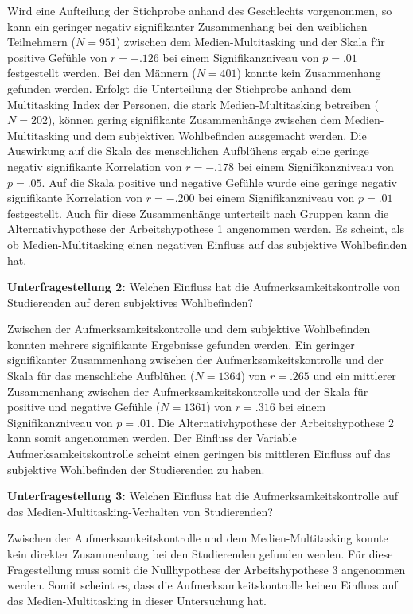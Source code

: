 Wird eine Aufteilung der Stichprobe anhand des Geschlechts vorgenommen, so kann ein geringer negativ signifikanter Zusammenhang bei den weiblichen Teilnehmern ($N=951$) zwischen dem Medien-Multitasking und der Skala für positive Gefühle von $r=-.126$ bei einem Signifikanzniveau von $p=.01$ festgestellt werden. Bei den Männern ($N=401$) konnte kein Zusammenhang gefunden werden. Erfolgt die Unterteilung der Stichprobe anhand dem Multitasking Index der Personen, die stark Medien-Multitasking betreiben ($N=202$), können gering signifikante Zusammenhänge zwischen dem Medien-Multitasking und dem subjektiven Wohlbefinden ausgemacht werden. Die Auswirkung auf die Skala des  menschlichen Aufblühens ergab eine geringe negativ signifikante Korrelation von $r=-.178$ bei einem Signifikanzniveau von $p=.05$. Auf die Skala positive und negative Gefühle wurde eine geringe negativ signifikante Korrelation von $r=-.200$ bei einem Signifikanzniveau von $p=.01$ festgestellt. Auch für diese Zusammenhänge unterteilt nach Gruppen kann die Alternativhypothese der Arbeitshypothese 1 angenommen werden. Es scheint, als ob Medien-Multitasking einen negativen Einfluss auf das subjektive Wohlbefinden hat.
\par
\textbf{Unterfragestellung 2:} Welchen Einfluss hat die Aufmerksamkeitskontrolle von Studierenden auf deren subjektives Wohlbefinden?
\par
Zwischen der Aufmerksamkeitskontrolle und dem subjektive Wohlbefinden konnten mehrere signifikante Ergebnisse gefunden werden. Ein geringer signifikanter Zusammenhang zwischen der Aufmerksamkeitskontrolle und der Skala für das menschliche Aufblühen ($N=1364$) von $r=.265$ und ein mittlerer Zusammenhang zwischen der Aufmerksamkeitskontrolle und der Skala für positive und negative Gefühle ($N=1361$) von $r=.316$ bei einem Signifikanzniveau von $p=.01$. Die Alternativhypothese der Arbeitshypothese 2 kann somit angenommen werden. Der Einfluss der Variable Aufmerksamkeitskontrolle scheint einen geringen bis mittleren Einfluss auf das subjektive Wohlbefinden der Studierenden zu haben.
\par
\textbf{Unterfragestellung 3:} Welchen Einfluss hat die Aufmerksamkeitskontrolle auf das Medien-Multitasking-Verhalten von Studierenden?
\par
Zwischen der Aufmerksamkeitskontrolle und dem Medien-Multitasking konnte kein direkter Zusammenhang bei den Studierenden gefunden werden. Für diese Fragestellung muss somit die Nullhypothese der Arbeitshypothese 3 angenommen werden. Somit scheint es, dass die Aufmerksamkeitskontrolle keinen Einfluss auf das Medien-Multitasking in dieser Untersuchung hat. \\
